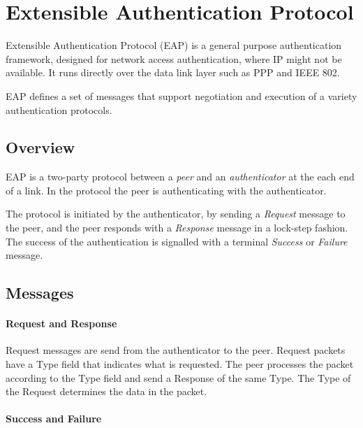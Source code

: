 \section{Extensible Authentication Protocol}


Extensible Authentication Protocol \cite{aboba2004extensible} (EAP) is a general purpose authentication framework, designed for network access authentication, where IP might not be available. 
It runs directly over the data link layer such as PPP  \cite{simpson1994rfc1661} and IEEE 802.

EAP defines a set of messages that support negotiation and execution of a variety authentication protocols.


\subsection{Overview}
EAP is a two-party protocol between a \textit{peer} and an \textit{authenticator} at the each end of a link. In the protocol the peer is authenticating with the authenticator.

The protocol is initiated by the authenticator, by sending a \textit{Request} message to the peer, and the peer responds with a \textit{Response} message in a lock-step fashion. 
The success of the authentication is signalled  with a terminal \textit{Success} or \textit{Failure} message.

\subsection{Messages}

\paragraph{Request and Response}

Request messages are send from the authenticator to the peer.
Request packets have a Type field that indicates what is requested.
The peer processes the packet according to the Type field and send a Response of the same Type.
The Type of the Request determines the data in the packet.

\paragraph{Success and Failure}

